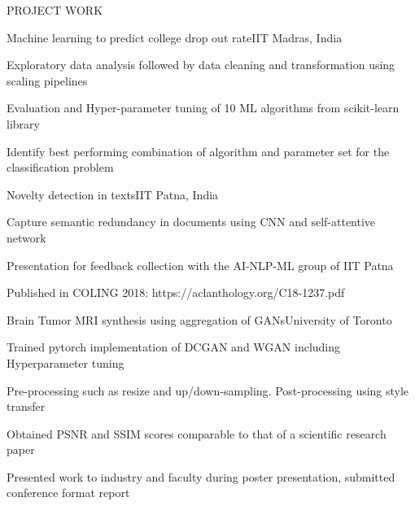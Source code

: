 \documentclass{resume}
\begin{document}
  \begin{rSection}{PROJECT WORK}

    \begin{rSubsection}{Machine learning to predict college drop out rate}{IIT Madras, India}{}{}
      \item Exploratory data analysis followed by data cleaning and transformation using scaling pipelines
      \item Evaluation and Hyper-parameter tuning of 10 ML algorithms from scikit-learn library
      \item Identify best performing combination of algorithm and parameter set for the classification problem
    \end{rSubsection}

    \begin{rSubsection}{Novelty detection in texts}{IIT Patna, India}{}{}
      \item Capture semantic redundancy in documents using CNN and self-attentive network
      \item Presentation for feedback collection with the AI-NLP-ML group of IIT Patna
      \item Published in COLING 2018: https://aclanthology.org/C18-1237.pdf
    \end{rSubsection}

    \begin{rSubsection}{Brain Tumor MRI synthesis using aggregation of GANs}{University of Toronto}{}{}
      \item Trained pytorch implementation of DCGAN and WGAN including Hyperparameter tuning
      \item Pre-processing such as resize and up/down-sampling. Post-processing using style transfer
      \item Obtained PSNR and SSIM scores comparable to that of a scientific research paper
      \item Presented work to industry and faculty during poster presentation, submitted conference format report
    \end{rSubsection}



\end{rSection}
\end{document}
